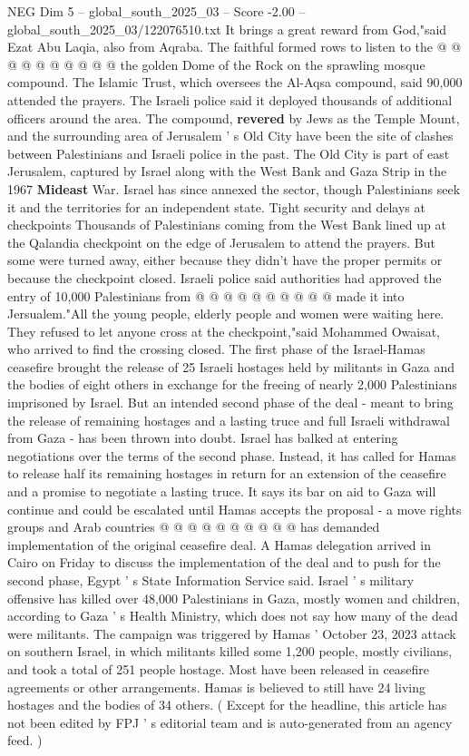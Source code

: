\begin{textsample}{NEG Dim 5 – global\_south\_2025\_03 – Score -2.00 – global\_south\_2025\_03/122076510.txt}
It brings a great reward from God,"said Ezat Abu Laqia, also from Aqraba.
The faithful formed rows to listen to the @ @ @ @ @ @ @ @ @ @ the golden Dome of the Rock on the sprawling mosque compound.
The Islamic Trust, which oversees the Al-Aqsa compound, said 90,000 attended the prayers.
The Israeli police said it deployed thousands of additional officers around the area.
The compound, \textbf{revered} by Jews as the Temple Mount, and the surrounding area of Jerusalem ' s Old City have been the site of clashes between Palestinians and Israeli police in the past.
The Old City is part of east Jerusalem, captured by Israel along with the West Bank and Gaza Strip in the 1967 \textbf{Mideast} War.
Israel has since annexed the sector, though Palestinians seek it and the territories for an independent state.
Tight security and delays at checkpoints Thousands of Palestinians coming from the West Bank lined up at the Qalandia checkpoint on the edge of Jerusalem to attend the prayers.
But some were turned away, either because they didn't have the proper permits or because the checkpoint closed.
Israeli police said authorities had approved the entry of 10,000 Palestinians from @ @ @ @ @ @ @ @ @ @ made it into Jersualem."All the young people, elderly people and women were waiting here.
They refused to let anyone cross at the checkpoint,"said Mohammed Owaisat, who arrived to find the crossing closed.
The first phase of the Israel-Hamas ceasefire brought the release of 25 Israeli hostages held by militants in Gaza and the bodies of eight others in exchange for the freeing of nearly 2,000 Palestinians imprisoned by Israel.
But an intended second phase of the deal - meant to bring the release of remaining hostages and a lasting truce and full Israeli withdrawal from Gaza - has been thrown into doubt.
Israel has balked at entering negotiations over the terms of the second phase.
Instead, it has called for Hamas to release half its remaining hostages in return for an extension of the ceasefire and a promise to negotiate a lasting truce.
It says its bar on aid to Gaza will continue and could be escalated until Hamas accepts the proposal - a move rights groups and Arab countries @ @ @ @ @ @ @ @ @ @ has demanded implementation of the original ceasefire deal.
A Hamas delegation arrived in Cairo on Friday to discuss the implementation of the deal and to push for the second phase, Egypt ' s State Information Service said.
Israel ' s military offensive has killed over 48,000 Palestinians in Gaza, mostly women and children, according to Gaza ' s Health Ministry, which does not say how many of the dead were militants.
The campaign was triggered by Hamas ' October 23, 2023 attack on southern Israel, in which militants killed some 1,200 people, mostly civilians, and took a total of 251 people hostage.
Most have been released in ceasefire agreements or other arrangements.
Hamas is believed to still have 24 living hostages and the bodies of 34 others. ( Except for the headline, this article has not been edited by FPJ ' s editorial team and is auto-generated from an agency feed. )

\end{textsample}
